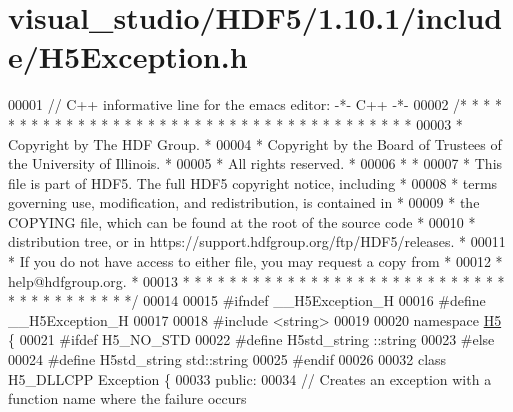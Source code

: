 \hypertarget{visual__studio_2_h_d_f5_21_810_81_2include_2_h5_exception_8h_source}{}\section{visual\+\_\+studio/\+H\+D\+F5/1.10.1/include/\+H5\+Exception.h}
\label{visual__studio_2_h_d_f5_21_810_81_2include_2_h5_exception_8h_source}

\begin{DoxyCode}
00001 \textcolor{comment}{// C++ informative line for the emacs editor: -*- C++ -*-}
00002 \textcolor{comment}{/* * * * * * * * * * * * * * * * * * * * * * * * * * * * * * * * * * * * * * *}
00003 \textcolor{comment}{ * Copyright by The HDF Group.                                               *}
00004 \textcolor{comment}{ * Copyright by the Board of Trustees of the University of Illinois.         *}
00005 \textcolor{comment}{ * All rights reserved.                                                      *}
00006 \textcolor{comment}{ *                                                                           *}
00007 \textcolor{comment}{ * This file is part of HDF5.  The full HDF5 copyright notice, including     *}
00008 \textcolor{comment}{ * terms governing use, modification, and redistribution, is contained in    *}
00009 \textcolor{comment}{ * the COPYING file, which can be found at the root of the source code       *}
00010 \textcolor{comment}{ * distribution tree, or in https://support.hdfgroup.org/ftp/HDF5/releases.  *}
00011 \textcolor{comment}{ * If you do not have access to either file, you may request a copy from     *}
00012 \textcolor{comment}{ * help@hdfgroup.org.                                                        *}
00013 \textcolor{comment}{ * * * * * * * * * * * * * * * * * * * * * * * * * * * * * * * * * * * * * * */}
00014 
00015 \textcolor{preprocessor}{#ifndef \_\_H5Exception\_H}
00016 \textcolor{preprocessor}{#define \_\_H5Exception\_H}
00017 
00018 \textcolor{preprocessor}{#include <string>}
00019 
00020 \textcolor{keyword}{namespace }\hyperlink{namespace_h5}{H5} \{
00021 \textcolor{preprocessor}{#ifdef H5\_NO\_STD}
00022 \textcolor{preprocessor}{    #define H5std\_string ::string}
00023 \textcolor{preprocessor}{#else}
00024 \textcolor{preprocessor}{    #define H5std\_string std::string}
00025 \textcolor{preprocessor}{#endif}
00026 
00032 \textcolor{keyword}{class }H5\_DLLCPP Exception \{
00033    \textcolor{keyword}{public}:
00034         \textcolor{comment}{// Creates an exception with a function name where the failure occurs}

\end{DoxyCode}
